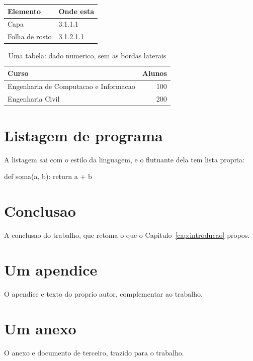 \documentclass[grad]{ufrj}
\begin{document}
  \begin{quadro}[htbp]
    \caption{Um quadro: informacao textual, com as quatro bordas}
    \centering
    \begin{tabular}{|l|l|}
      \hline
      Elemento & Onde esta \\
      \hline
      Capa & 3.1.1.1 \\
      Folha de rosto & 3.1.2.1.1 \\
      \hline
    \end{tabular}
  \end{quadro}

  \begin{table}[htbp]
    \caption{Uma tabela: dado numerico, sem as bordas laterais}
    \centering
    \begin{tabular}{lr}
      \hline
      Curso & Alunos \\
      \hline
      Engenharia de Computacao e Informacao & 100 \\
      Engenharia Civil & 200 \\
      \hline
    \end{tabular}
  \end{table}

  \chapter{Listagem de programa}
  \label{cap:programa}
  A listagem sai com o estilo da linguagem, e o flutuante dela tem lista
  propria:

  \begin{python}[caption={Um programa de exemplo},label={prog:exemplo}]
def soma(a, b):
    return a + b
  \end{python}

  \chapter{Conclusao}
  \label{cap:conclusao}
  A conclusao do trabalho, que retoma o que o Capitulo~\ref{cap:introducao}
  propos.

  \appendix
  \chapter{Um apendice}
  O apendice e texto do proprio autor, complementar ao trabalho.

  \annex
  \chapter{Um anexo}
  O anexo e documento de terceiro, trazido para o trabalho.

  \backmatter
  \printbibliography
  \printglossarylist
  \printindex
\end{document}
